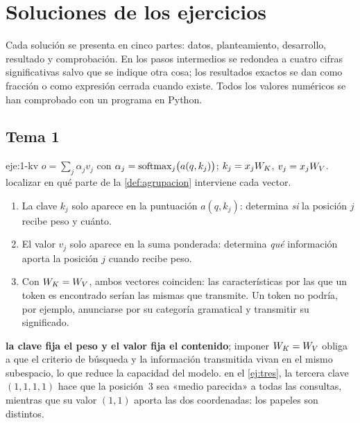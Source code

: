 \chapter{Soluciones de los ejercicios}
\label{ap:soluciones}

Cada solución se presenta en cinco partes: datos, planteamiento, desarrollo, resultado y comprobación. En los pasos intermedios se redondea a cuatro cifras significativas salvo que se indique otra cosa; los resultados exactos se dan como fracción o como expresión cerrada cuando existe. Todos los valores numéricos se han comprobado con un programa en Python.

\section{Tema 1}

\begin{solucion}{eje:1-kv}
\datos $o=\sum_j\alpha_jv_j$ con $\alpha_j=\operatorname{softmax}_j\bigl(a(q,k_j)\bigr)$; $k_j=x_jW_{K}$, $v_j=x_jW_{V}$.
\planteamiento localizar en qué parte de la \cref{def:agrupacion} interviene cada vector.
\pasos
\begin{enumerate}[label=\arabic*.]
  \item La clave $k_j$ solo aparece en la puntuación $a(q,k_j)$: determina \emph{si} la posición $j$ recibe peso y cuánto.
  \item El valor $v_j$ solo aparece en la suma ponderada: determina \emph{qué} información aporta la posición $j$ cuando recibe peso.
  \item Con $W_{K}=W_{V}$, ambos vectores coinciden: las características por las que un token es encontrado serían las mismas que transmite. Un token no podría, por ejemplo, anunciarse por su categoría gramatical y transmitir su significado.
\end{enumerate}
\resultado \textbf{la clave fija el peso y el valor fija el contenido}; imponer $W_{K}=W_{V}$ obliga a que el criterio de búsqueda y la información transmitida vivan en el mismo subespacio, lo que reduce la capacidad del modelo.
\comprobacion en el \cref{ej:tres}, la tercera clave $(1,1,1,1)$ hace que la posición~3 sea «medio parecida» a todas las consultas, mientras que su valor $(1,1)$ aporta las dos coordenadas: los papeles son distintos.
\end{solucion}

